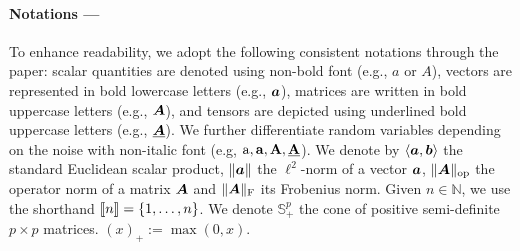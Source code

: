 \paragraph{Notations ---} To enhance readability, we adopt the following consistent notations through the paper: scalar quantities are denoted using non-bold font (e.g., \(a\) or \(A\)), vectors are represented in bold lowercase letters (e.g., \(\bm{a}\)), matrices are written in bold uppercase letters (e.g., \(\bm{A}\)), and tensors are depicted using underlined bold uppercase letters (e.g., \({\underline{\bm{A}}}\)). We further differentiate random variables depending on the noise with non-italic font (e.g, ${ \mathrm{a} }, \boldsymbol{\mathbf{a}}, \boldsymbol{\mathbf{A}}, {\underline{\boldsymbol{\mathbf{A}}}}$).  We denote by $\langle \bm{a} , \bm{b} \rangle$   the standard Euclidean scalar product, $\| \bm{a} \|$ the $\ell^2$-norm of a vector $\bm{a}$, $ \|\bm{A} \|_{\mathrm{op}} $ the operator norm of a matrix $\bm{A}$ and $ \|\bm{A} \|_{\mathrm{F}} $ its Frobenius norm.  Given $n \in \mathbb{N}$, we use the shorthand $ \llbracket n \rrbracket  = \{1, \dots, n\}$. We denote $\mathbb{S}_+^p$ the cone of positive semi-definite $p\times p$ matrices. $(x)_+ := \max(0,x)$. 


